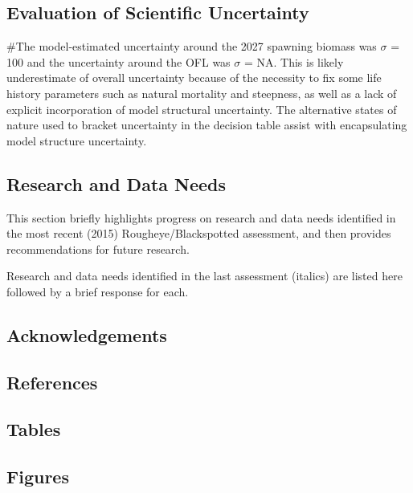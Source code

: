 \documentclass[
]{scrartcl}
\begin{document}
\subsection{Evaluation of Scientific
Uncertainty}\label{evaluation-of-scientific-uncertainty-1}

\#The model-estimated uncertainty around the 2027 spawning biomass was
\(\sigma\) = 100 and the uncertainty around the OFL was \(\sigma\) = NA.
This is likely underestimate of overall uncertainty because of the
necessity to fix some life history parameters such as natural mortality
and steepness, as well as a lack of explicit incorporation of model
structural uncertainty. The alternative states of nature used to bracket
uncertainty in the decision table assist with encapsulating model
structure uncertainty.

\subsection{Research and Data Needs}\label{research-and-data-needs-1}

This section briefly highlights progress on research and data needs
identified in the most recent (2015) Rougheye/Blackspotted assessment,
and then provides recommendations for future research.

Research and data needs identified in the last assessment (italics) are
listed here followed by a brief response for each.

\newpage{}

\subsection{Acknowledgements}\label{sec-acknowledgements}

\newpage{}

\subsection{References}\label{references}

\newpage{}

\subsection{Tables}\label{tables}

\newpage{}

\subsection{Figures}\label{figures}
\end{document}
